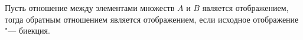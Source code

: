 
    Пусть отношение между элементами множеств $A$ и $B$ является отображением, тогда обратным отношением является отображением, если исходное отображение "--- биекция.
